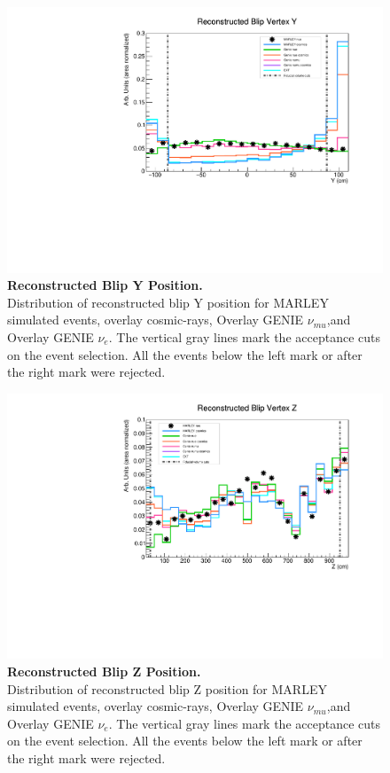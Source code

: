 \begin{figure}[h!]
    \centering
    \includegraphics[width=120mm]{Figures/vertex_Y.pdf}
    \caption[Reconstructed Blip Y Position.]{{\textbf{Reconstructed Blip Y Position.}}\\ Distribution of reconstructed blip Y position for MARLEY simulated events, overlay cosmic-rays, Overlay GENIE $\nu_{mu}$,and Overlay GENIE $\nu_{e}$. The vertical gray lines mark the acceptance cuts on the event selection. All the events below the left mark or after the right mark were rejected.}
    \label{vertex_Y}
\end{figure}

\begin{figure}[h!]
    \centering
    \includegraphics[width=120mm]{Figures/vertex_Z.pdf}
    \caption[Reconstructed Blip Z Position.]{{\textbf{Reconstructed Blip Z Position.}}\\ Distribution of reconstructed blip Z position for MARLEY simulated events, overlay cosmic-rays, Overlay GENIE $\nu_{mu}$,and Overlay GENIE $\nu_{e}$. The vertical gray lines mark the acceptance cuts on the event selection. All the events below the left mark or after the right mark were rejected.}
    \label{vertex_Z}
\end{figure}

